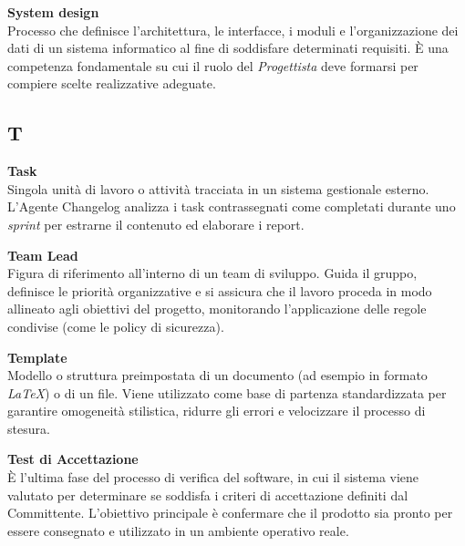 \documentclass[12pt, a4paper]{article}
\begin{document}
\noindent\hypertarget{system-design}{\textbf{System design}} \\[0.1em]
Processo che definisce l'architettura, le interfacce, i moduli e l'organizzazione dei dati di un sistema informatico al fine di soddisfare determinati requisiti. È una competenza fondamentale su cui il ruolo del \textit{Progettista} deve formarsi per compiere scelte realizzative adeguate.
\vspace{0.5cm}  

\newpage
\subsection*{T}
{}
\vspace{0.2cm}

\noindent\hypertarget{task}{\textbf{Task}} \\[0.1em]
Singola unità di lavoro o attività tracciata in un sistema gestionale esterno. L'Agente Changelog analizza i task contrassegnati come completati durante uno \textit{sprint} per estrarne il contenuto ed elaborare i report.
\vspace{0.5cm}  

\noindent\hypertarget{team-lead}{\textbf{Team Lead}} \\[0.1em]
Figura di riferimento all'interno di un team di sviluppo. Guida il gruppo, definisce le priorità organizzative e si assicura che il lavoro proceda in modo allineato agli obiettivi del progetto, monitorando l'applicazione delle regole condivise (come le policy di sicurezza).
\vspace{0.5cm}

\noindent\hypertarget{template}{\textbf{Template}} \\[0.1em]
Modello o struttura preimpostata di un documento (ad esempio in formato \textit{LaTeX}) o di un file. Viene utilizzato come base di partenza standardizzata per garantire omogeneità stilistica, ridurre gli errori e velocizzare il processo di stesura.
\vspace{0.5cm}

\noindent\hypertarget{test-di-accettazione}{\textbf{Test di Accettazione}} \\[0.1em]
È l'ultima fase del processo di verifica del software, in cui il sistema viene valutato per determinare se soddisfa i criteri di accettazione definiti dal Committente. L'obiettivo principale è confermare che il prodotto sia pronto per essere consegnato e utilizzato in un ambiente operativo reale.
\vspace{0.5cm}
\end{document}
